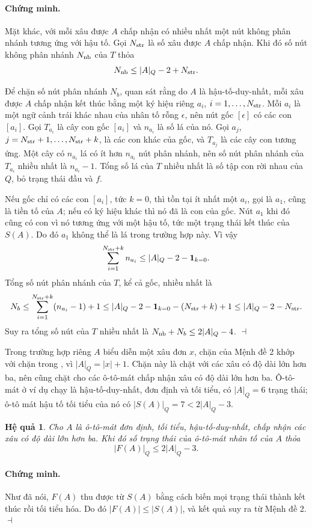 \documentclass[11pt]{article}
\newtheorem{corollary}{Hệ quả}
\newenvironment{proof}{\paragraph{Chứng minh.}}{\hfill$\dashv$\par}
\newcommand{\eps}{\epsilon}
\begin{document}
\begin{proof}
Mặt khác, với mỗi xâu được $A$ chấp nhận có nhiều nhất một nút không phân
nhánh tương ứng với hậu tố. Gọi $N_{\rm str}$ là số xâu được $A$ chấp nhận.
Khi đó số nút không phân nhánh $N_{\rm nb}$ của $T$ thỏa
\[
  N_{\rm nb}\le |A|_Q-2+N_{\rm str}.
\]

Để chặn số nút phân nhánh $N_b$, quan sát rằng do $A$ là hậu-tố-duy-nhất, mỗi
xâu được $A$ chấp nhận kết thúc bằng một ký hiệu riêng $a_i$,
$i=1,\ldots,N_{\rm str}$. Mỗi $a_i$ là một ngữ cảnh trái khác nhau của nhân tố
rỗng $\eps$, nên nút gốc $[\eps]$ có các con $[a_i]$. Gọi $T_{a_i}$ là cây con
gốc $[a_i]$ và $n_{a_i}$ là số lá của nó. Gọi
$a_j$, $j=N_{\rm str}+1,\ldots,N_{\rm str}+k$, là các con khác của gốc, và
$T_{a_j}$ là các cây con tương ứng. Một cây có $n_{a_i}$ lá có ít hơn
$n_{a_i}$ nút phân nhánh, nên số nút phân nhánh của $T_{a_i}$ nhiều nhất là
$n_{a_i}-1$. Tổng số lá của $T$ nhiều nhất là số tập con rời nhau của $Q$, bỏ
trạng thái đầu và $f$.

Nếu gốc chỉ có các con $[a_i]$, tức $k=0$, thì tồn tại ít nhất một $a_i$, gọi
là $a_1$, cũng là tiền tố của $A$; nếu có ký hiệu khác thì nó đã là con của
gốc. Nút $a_1$ khi đó cũng có con vì nó tương ứng với một hậu tố, tức một
trạng thái kết thúc của $S(A)$. Do đó $a_1$ không thể là lá trong trường hợp
này. Vì vậy
\[
  \sum_{i=1}^{N_{\rm str}+k} n_{a_i}\le |A|_Q-2-\mathbf 1_{k=0}.
\]
Tổng số nút phân nhánh của $T$, kể cả gốc, nhiều nhất là
\[
  N_b \le \sum_{i=1}^{N_{\rm str}+k}(n_{a_i}-1)+1
      \le |A|_Q-2-\mathbf 1_{k=0}-(N_{\rm str}+k)+1
      \le |A|_Q-2-N_{\rm str}.
\]
Suy ra tổng số nút của $T$ nhiều nhất là
$N_{\rm nb}+N_b\le 2|A|_Q-4$.
\end{proof}

Trong trường hợp riêng $A$ biểu diễn một xâu đơn $x$, chặn của Mệnh đề 2 khớp
với chặn trong \cite{crochemore-transducers,blumer-smallest}, vì
$|A|_Q=|x|+1$. Chặn này là chặt với các xâu có độ dài lớn hơn ba, nên cũng
chặt cho các ô-tô-mát chấp nhận xâu có độ dài lớn hơn ba. Ô-tô-mát ở ví dụ
chạy là hậu-tố-duy-nhất, đơn định và tối tiểu, có $|A|_Q=6$ trạng thái; ô-tô
mát hậu tố tối tiểu của nó có $|S(A)|_Q=7<2|A|_Q-3$.

\begin{corollary}
Cho $A$ là ô-tô-mát đơn định, tối tiểu, hậu-tố-duy-nhất, chấp nhận các xâu có
độ dài lớn hơn ba. Khi đó số trạng thái của ô-tô-mát nhân tố của $A$ thỏa
\[
  |F(A)|_Q \le 2|A|_Q-3.
\tag{6}
\]
\end{corollary}

\begin{proof}
Như đã nói, $F(A)$ thu được từ $S(A)$ bằng cách biến mọi trạng thái thành kết
thúc rồi tối tiểu hóa. Do đó $|F(A)|\le |S(A)|$, và kết quả suy ra từ Mệnh đề
2.
\end{proof}
\end{document}
